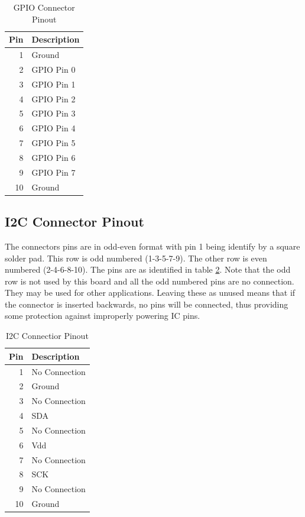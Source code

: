 \documentclass[10pt, openany]{book}
\begin{document}
\begin{table}
  \label{tbl:GPIO-Pins}
  \caption{GPIO Connector Pinout}
  \centering
  \begin{tabular}{|r|l|}
    \hline
    Pin & Description\\
    \hline
    1 & Ground\\
    2 & GPIO Pin 0\\
    3 & GPIO Pin 1\\
    4 & GPIO Pin 2\\
    5 & GPIO Pin 3\\
    6 & GPIO Pin 4\\
    7 & GPIO Pin 5\\
    8 & GPIO Pin 6\\
    9 & GPIO Pin 7\\
    10 & Ground\\
    \hline
  \end{tabular}
\end{table}

\subsection{I2C Connector Pinout}
The connectors pins are in odd-even format with pin 1 being identify by a square solder pad.  This row is odd numbered (1-3-5-7-9).  The other row is even numbered (2-4-6-8-10).  The pins are as identified in table \ref{tbl:I2C-Pins}.  Note that the odd row is not used by this board and all the odd numbered pins are no connection.  They may be used for other applications.  Leaving these as unused means that if the connector is inserted backwards, no pins will be connected, thus providing some protection against improperly powering IC pins.

\begin{table}
  \label{tbl:I2C-Pins}
  \caption{I2C Connectior Pinout}
  \centering
  \begin{tabular}{|r|l|}
    \hline
    Pin & Description\\
    \hline
    1 & No Connection\\
    2 & Ground\\
    3 & No Connection\\
    4 & SDA\\
    5 & No Connection\\
    6 & Vdd\\
    7 & No Connection\\
    8 & SCK\\
    9 & No Connection\\
    10 & Ground\\
    \hline
  \end{tabular}
\end{table}
\end{document}
